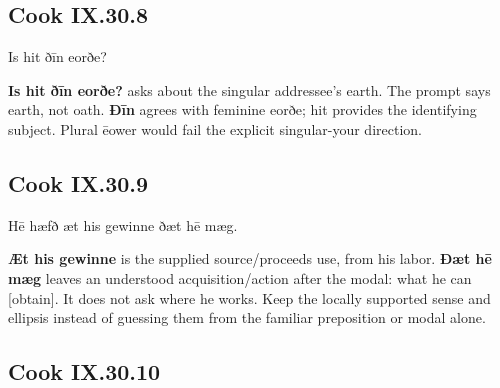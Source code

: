 \subsection*{Cook IX.30.8}

\par\begin{minipage}{\linewidth}\raggedright
Is hit ðīn eorðe?

\textbf{Is hit ðīn eorðe?} asks about the singular addressee’s earth. The prompt says earth, not oath. \textbf{Ðīn} agrees with feminine eorðe; hit provides the identifying subject. Plural ēower would fail the explicit singular-your direction.

\end{minipage}\par\addvspace{4pt}

\subsection*{Cook IX.30.9}

\par\begin{minipage}{\linewidth}\raggedright
Hē hæfð æt his gewinne ðæt hē mæg.

\textbf{Æt his gewinne} is the supplied source/\allowbreak{}proceeds use, from his labor. \textbf{Ðæt hē mæg} leaves an understood acquisition/\allowbreak{}action after the modal: what he can [obtain]. It does not ask where he works. Keep the locally supported sense and ellipsis instead of guessing them from the familiar preposition or modal alone.

\end{minipage}\par\addvspace{4pt}

\subsection*{Cook IX.30.10}


